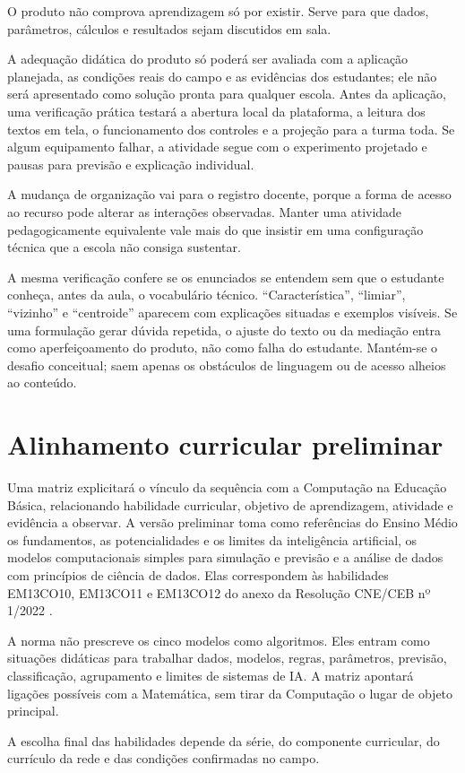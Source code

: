 O produto não comprova aprendizagem só por existir. Serve para que dados, parâmetros, cálculos e resultados sejam discutidos em sala.

A adequação didática do produto só poderá ser avaliada com a aplicação planejada, as condições reais do campo e as evidências dos estudantes; ele não será apresentado como solução pronta para qualquer escola. Antes da aplicação, uma verificação prática testará a abertura local da plataforma, a leitura dos textos em tela, o funcionamento dos controles e a projeção para a turma toda. Se algum equipamento falhar, a atividade segue com o experimento projetado e pausas para previsão e explicação individual.

A mudança de organização vai para o registro docente, porque a forma de acesso ao recurso pode alterar as interações observadas. Manter uma atividade pedagogicamente equivalente vale mais do que insistir em uma configuração técnica que a escola não consiga sustentar.

A mesma verificação confere se os enunciados se entendem sem que o estudante conheça, antes da aula, o vocabulário técnico. ``Característica'', ``limiar'', ``vizinho'' e ``centroide'' aparecem com explicações situadas e exemplos visíveis. Se uma formulação gerar dúvida repetida, o ajuste do texto ou da mediação entra como aperfeiçoamento do produto, não como falha do estudante. Mantém-se o desafio conceitual; saem apenas os obstáculos de linguagem ou de acesso alheios ao conteúdo.

\section{Alinhamento curricular preliminar}

Uma matriz explicitará o vínculo da sequência com a Computação na Educação Básica, relacionando habilidade curricular, objetivo de aprendizagem, atividade e evidência a observar. A versão preliminar toma como referências do Ensino Médio os fundamentos, as potencialidades e os limites da inteligência artificial, os modelos computacionais simples para simulação e previsão e a análise de dados com princípios de ciência de dados. Elas correspondem às habilidades EM13CO10, EM13CO11 e EM13CO12 do anexo da Resolução CNE/CEB nº 1/2022 \cite{brasil2022computacao}.

A norma não prescreve os cinco modelos como algoritmos. Eles entram como situações didáticas para trabalhar dados, modelos, regras, parâmetros, previsão, classificação, agrupamento e limites de sistemas de IA. A matriz apontará ligações possíveis com a Matemática, sem tirar da Computação o lugar de objeto principal.

A escolha final das habilidades depende da série, do componente curricular, do currículo da rede e das condições confirmadas no campo.
